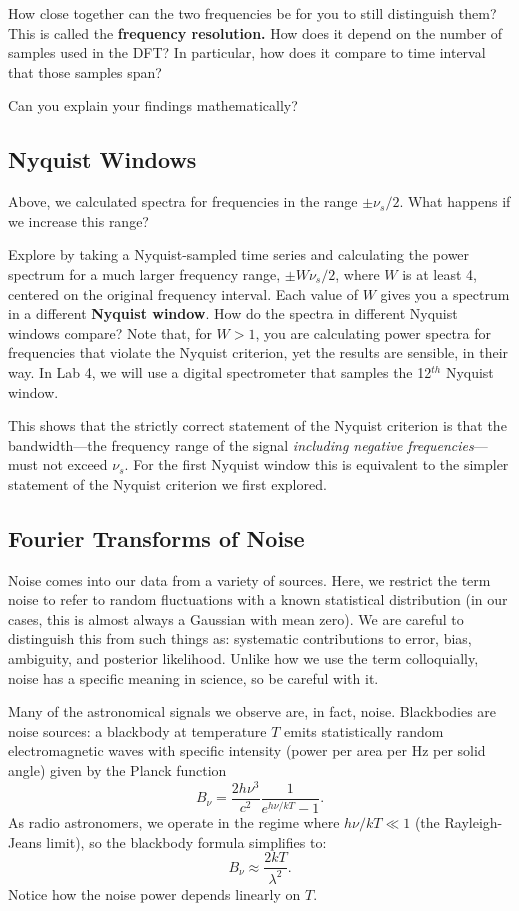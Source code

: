 \documentclass[11pt,preprint]{aastex}
\begin{document}
How close together can the two frequencies be for you to still 
distinguish them? This is called the {\bf frequency resolution.} How
does it depend on the number of samples used in the DFT? In
particular, how does it compare to time interval that
those samples span?

Can you explain your findings mathematically?

\subsection{Nyquist Windows}

\noindent
Above, we calculated spectra for frequencies in the range $\pm
\nu_s/2$. What happens if we increase this range?

Explore by
taking a Nyquist-sampled time series and calculating the power
spectrum for a much larger frequency range, $\pm W \nu_s/2$, where
$W$ is at least 4, centered on the original frequency interval. Each value
of $W$ gives you a spectrum in a different {\bf Nyquist window}. How do
the spectra in different Nyquist windows compare? Note that, for $W>1$,
you are calculating power spectra for frequencies that violate the
Nyquist criterion, yet the results are sensible, in their way. 
In Lab 4, we will use a digital spectrometer that samples the
12$^{th}$ Nyquist window.

This shows that the strictly correct statement of the Nyquist criterion
is that the bandwidth---the frequency range of the
signal {\it including negative frequencies}---must not exceed $\nu_s$. For the first Nyquist window this
is equivalent to the simpler statement of the Nyquist criterion we first
explored.

\subsection{Fourier Transforms of Noise}

\noindent
Noise comes into our data from a variety of sources. 
Here, we restrict the term noise to refer to random fluctuations with a known statistical distribution (in
our cases, this is almost always a Gaussian with mean zero). We are careful to distinguish
this from such things as: systematic contributions to error, bias, ambiguity, and posterior likelihood.
Unlike how we use the term colloquially, noise has a specific meaning in science, so be careful with it.

Many of the astronomical signals we observe are, in fact, noise. 
Blackbodies are noise sources: a blackbody at temperature $T$ emits statistically 
random electromagnetic waves
with specific intensity (power per area per Hz per solid angle) given by the 
Planck function
\begin{equation}
B_\nu = \frac{2h\nu^3}{c^2}\frac{1}{e^{h\nu/kT}-1}. 
\end{equation}
As radio astronomers, we
operate in the regime where $h\nu/kT \ll 1$ (the Rayleigh-Jeans limit), 
so the blackbody formula simplifies to:
\begin{equation}
B_\nu\approx\frac{2kT}{\lambda^2}. 
\end{equation}
Notice how the noise power depends linearly on $T$. 
\end{document}
